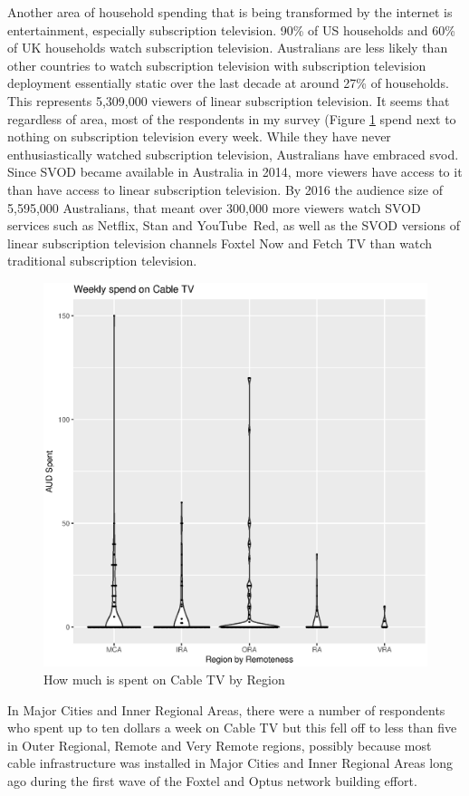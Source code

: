 Another area of household spending that is being transformed by the internet is entertainment, especially subscription television. 90\% of US households and 60\% of UK households watch subscription television\cite{RefWorks:406}.  Australians are less likely than other countries to watch subscription television with subscription television deployment essentially static over the last decade at around 27\% of households. This represents 5,309,000 viewers of linear subscription television. It seems that regardless of area, most of the respondents in my survey (Figure \ref{fig:VC012CableSpendRegions} spend next to nothing on subscription television every week. While they have never enthusiastically watched subscription television,  Australians have embraced \acrfull{svod}.  Since SVOD became available in Australia in 2014, more viewers have access to it than have access to linear subscription television. By 2016 the audience size of 5,595,000 Australians, that meant over 300,000 more viewers watch SVOD services such as Netflix, Stan and YouTube~Red, as well as the SVOD versions of linear subscription television channels Foxtel Now and Fetch TV than watch traditional subscription television\cite{RefWorks:407}.


\begin{figure}
\centering
\includegraphics[scale=0.5]{figures/VChart12-WeeklySpendCable.eps}
\caption{How much is spent on Cable TV by Region} \label{fig:VC012CableSpendRegions}
\end{figure}
In Major Cities and Inner Regional Areas, there were a number of respondents who spent up to ten dollars a week on Cable TV but this fell off to less than five in Outer Regional, Remote and Very Remote regions, possibly because most cable infrastructure was installed in Major Cities and Inner Regional Areas long ago during the first wave of the Foxtel and Optus network building effort.

